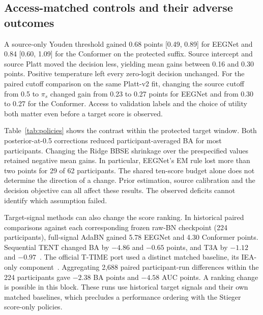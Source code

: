 \subsection{Access-matched controls and their adverse outcomes}
A source-only Youden threshold gained 0.68 points [0.49, 0.89] for EEGNet and 0.84 [0.60, 1.09] for the Conformer on the protected suffix. Source intercept and source Platt moved the decision less, yielding mean gains between 0.16 and 0.30 points. Positive temperature left every zero-logit decision unchanged. For the paired cutoff comparison on the same Platt-v2 fit, changing the source cutoff from 0.5 to $\pi_s$ changed gain from 0.23 to 0.27 points for EEGNet and from 0.30 to 0.27 for the Conformer. Access to validation labels and the choice of utility both matter even before a target score is observed.

\begin{table}[t]
\caption{Protected suffix by policy. The last two columns count participants with negative gain and gain below $-2$ points, respectively, out of 62, after averaging over models. Source Platt is source-only. The remaining rules read the first ten target scores. EM and BBSE additionally use the fitted source map.}\label{tab:policies}
\centering\footnotesize\end{table}

Table~\ref{tab:policies} shows the contrast within the protected target window. Both posterior-at-0.5 corrections reduced participant-averaged BA for most participants. Changing the Ridge BBSE shrinkage over the prespecified values retained negative mean gains. In particular, EEGNet's EM rule lost more than two points for 29 of 62 participants. The shared ten-score budget alone does not determine the direction of a change. Prior estimation, source calibration and the decision objective can all affect these results. The observed deficits cannot identify which assumption failed.

Target-signal methods can also change the score ranking. In historical paired comparisons against each corresponding frozen raw-BN checkpoint (224 participants), full-signal AdaBN gained 5.78 EEGNet and 4.30 Conformer points. Sequential TENT changed BA by $-4.86$ and $-0.65$ points, and T3A by $-1.12$ and $-0.97$~\cite{wang2021tent,iwasawa2021}. The official T-TIME port used a distinct matched baseline, its IEA-only component~\cite{li2024ttime}. Aggregating 2,688 paired participant-run differences within the 224 participants gave $-2.38$ BA points and $-4.58$ AUC points. A ranking change is possible in this block. These runs use historical target signals and their own matched baselines, which precludes a performance ordering with the Stieger score-only policies.
